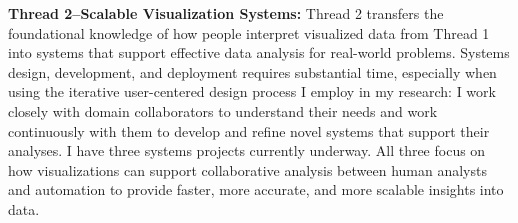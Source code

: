 \documentclass[11pt]{article}
\begin{document}



\textbf{Thread 2--Scalable Visualization Systems: }
Thread 2 transfers the foundational knowledge of how people interpret visualized data from Thread 1 into systems that support effective data analysis for real-world problems. 
Systems design, development, and deployment requires substantial time, especially when using the iterative user-centered design process I employ in my research: I work closely with domain collaborators to understand their needs and work continuously with them to develop and refine novel systems that support their analyses. I have three systems projects currently underway. All three focus on how visualizations can support collaborative analysis between human analysts and automation to provide faster, more accurate, and more scalable insights into data.
\end{document}

